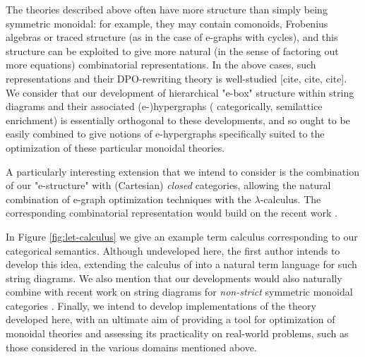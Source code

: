 The theories described above often have more structure than simply being symmetric monoidal: for example, they may contain comonoids, Frobenius algebras or traced structure (as in the case of e-graphs with cycles),  and this structure can be exploited to give more natural (in the sense of factoring out more equations) combinatorial representations.  In the above cases, such representations and their DPO-rewriting theory is well-studied 
\cite{ghica_rewriting_2023} %
[cite, cite, cite].  We consider that our development of hierarchical "e-box" structure within string diagrams and their associated (e-)hypergraphs ( categorically,  semilattice enrichment) is essentially orthogonal to these developments, and so ought to be easily combined to give notions of e-hypergraphs specifically suited to the optimization of these particular monoidal theories. 

A particularly interesting extension that we intend to consider is the combination of our "e-structure" with (Cartesian) \textit{closed} categories, allowing the natural combination of e-graph optimization techniques with the $\lambda$-calculus.  The corresponding combinatorial representation would build on the recent work \cite{ghica_hierarchical_2023, alvarez-picallo_rewriting_2022, alvarez-picallo_functorial_2021}. %

In Figure \ref{fig:let-calculus} we give an example term calculus corresponding to our categorical semantics.  Although undeveloped here, the first author intends to develop this idea, extending the calculus of \cite{heijltjes_functional_2023,barrett_functional_2023} into a natural term language for such string diagrams. 
We also mention that our developments would also naturally combine with recent work on string diagrams for \textit{non-strict} symmetric monoidal categories \cite{wilson_string_2023}.  %
Finally, we intend to develop implementations of the theory developed here,  with an ultimate aim of providing a tool for optimization of monoidal theories and assessing its practicality on real-world problems, such as those considered in the various domains mentioned above. 


